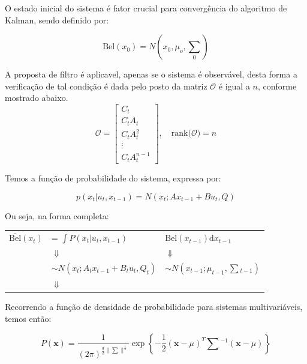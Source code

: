 O estado inicial do sistema é fator crucial para convergência do algoritmo de Kalman, sendo definido por:

\begin{equation}
    \text{Bel}(x_0) = N\left(x_0, \mu_o, {\textstyle\sum} _0\right)
\end{equation}

A proposta de filtro é aplicavel, apenas se o sistema é observável, desta forma a verificação de tal condição é dada pelo posto  da matriz $\mathcal {O}$ é igual a $n$, conforme mostrado abaixo.
\begin{equation*}
    \mathcal {O}={\begin{bmatrix}C_t\\C_tA_t\\C_tA^{2}_t\\\vdots \\C_tA^{n-1}_t\end{bmatrix}, \quad \text{rank}(\mathcal {O}}) = n
\end{equation*}

Temos a função de probabilidade do sistema, expressa por:

\begin{equation}
        p(x_t| u_t, x_{t-1})= N\left(x_t; Ax_{t-1}+ Bu_t, Q\right)
\end{equation}   

Ou seja, na forma completa:

\begin{tabular}{p{1.5cm} l l}
    $\overline{\text{Bel}}(x_t)$  & = $\displaystyle\int P(x_t|u_t, x_{t-1})$ & $\text{Bel}(x_{t-1})\text{d}x_{t-1}$ \\
    & \quad\quad\quad\quad\quad $\Downarrow$ & \quad\quad\quad$\Downarrow$ \\
    & $\sim N\left(x_t; A_t x_{t-1}+ B_tu_t, Q_t\right)$ & $\sim N\left(x_{t-1}; \mu_{t-1}, \textstyle\sum {}_{t-1}\right)$ \\
    & \quad\quad\quad\quad\quad $\Downarrow$ & \\
\end{tabular}

Recorrendo a função de densidade de probabilidade para sistemas multivariáveis, temos então:

\begin{equation}
    P(\mathbf{x}) = \frac{1}{(2\pi)^{\frac{d}{2}\|\sum\|^{\frac{1}{2}}}}\exp\left\{-\frac{1}{2} (\mathbf{x}-\mu)^T\textstyle\sum{}^{-1}(\mathbf{x}-\mu)\right\}
\end{equation}        

